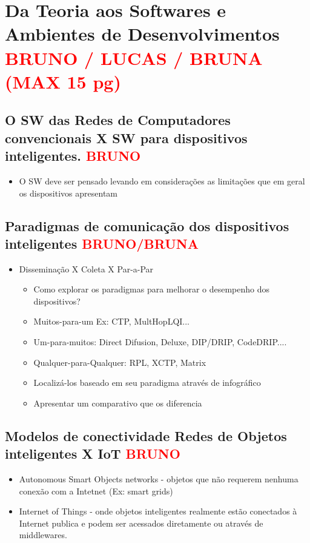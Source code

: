 
\section{Da Teoria aos Softwares e Ambientes de Desenvolvimentos 
\textcolor{red}{BRUNO / LUCAS / BRUNA (MAX 15 pg)}}
\label{sec:dtsad}

  \subsection{O SW das Redes de Computadores convencionais X SW para 
dispositivos inteligentes. \textcolor{red}{BRUNO}}
    \begin{itemize}
      \item O SW deve ser pensado levando em considerações as limitações 
que em geral os dispositivos apresentam
    \end{itemize}

  \subsection{Paradigmas de comunicação dos dispositivos inteligentes 
\textcolor{red}{BRUNO/BRUNA}}
    \begin{itemize}
      \item Disseminação X Coleta X Par-a-Par
	\begin{itemize}
	  \item Como explorar os paradigmas para melhorar o desempenho dos 
dispositivos?
	  \item Muitos-para-um Ex: CTP, MultHopLQI...
	  \item Um-para-muitos: Direct Difusion, Deluxe, DIP/DRIP, 
CodeDRIP....
	  \item Qualquer-para-Qualquer: RPL, XCTP, Matrix
	  \item Localizá-los baseado em seu paradigma através de 
infográfico
	  \item Apresentar um comparativo que os diferencia
	\end{itemize}
    \end{itemize}

  \subsection{Modelos de conectividade Redes de Objetos inteligentes X IoT  
\textcolor{red}{BRUNO}}
    \begin{itemize}
      \item Autonomous Smart Objects networks - objetos que não requerem 
nenhuma conexão com a Intetnet (Ex: smart grids)
      \item Internet of Things - onde objetos inteligentes realmente estão 
conectados à Internet publica e podem ser acessados diretamente ou através de 
middlewares.
    \end{itemize}

